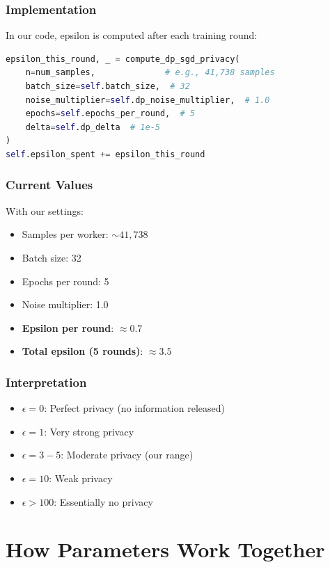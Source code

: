 \documentclass[12pt,a4paper]{article}
\begin{document}
\subsubsection{Implementation}

In our code, epsilon is computed after each training round:

\begin{lstlisting}[language=Python, basicstyle=\small]
epsilon_this_round, _ = compute_dp_sgd_privacy(
    n=num_samples,              # e.g., 41,738 samples
    batch_size=self.batch_size,  # 32
    noise_multiplier=self.dp_noise_multiplier,  # 1.0
    epochs=self.epochs_per_round,  # 5
    delta=self.dp_delta  # 1e-5
)
self.epsilon_spent += epsilon_this_round
\end{lstlisting}

\subsubsection{Current Values}

With our settings:
\begin{itemize}
    \item Samples per worker: $\sim 41,738$
    \item Batch size: 32
    \item Epochs per round: 5
    \item Noise multiplier: 1.0
    \item \textbf{Epsilon per round}: $\approx 0.7$
    \item \textbf{Total epsilon (5 rounds)}: $\approx 3.5$
\end{itemize}

\subsubsection{Interpretation}

\begin{itemize}
    \item $\epsilon = 0$: Perfect privacy (no information released)
    \item $\epsilon = 1$: Very strong privacy
    \item $\epsilon = 3-5$: Moderate privacy (our range)
    \item $\epsilon = 10$: Weak privacy
    \item $\epsilon > 100$: Essentially no privacy
\end{itemize}

\section{How Parameters Work Together}
\end{document}
